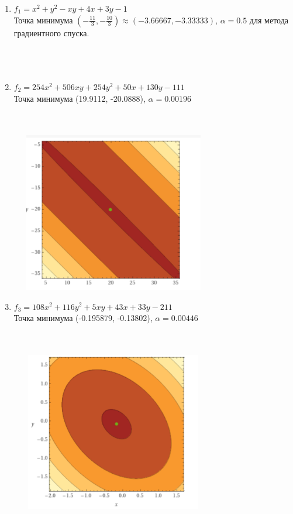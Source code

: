 \begin{enumerate}
	\item \(f_1 = x^2 + y^2 - xy + 4x + 3y - 1\) \\
	      Точка минимума \(\left( - \frac{11}{3}, - \frac{10}{3} \right) \approx ( - 3.66667, - 3.33333)\), $\alpha = 0.5$ для метода градиентного спуска. \\
	      \\
	       \\
	      \


	\item \(f_2 = 254x^2 + 506xy + 254y^2 + 50x + 130y - 111\) \\
	      Точка минимума (19.9112, -20.0888), $\alpha = 0.00196$ \\
	      \\
	       \\

	      \begin{center}
		      \includegraphics[width=9cm, height=7cm]{img/f2.png}
	      \end{center}

	\item \(f_3 = 108x^2 + 116y^2 + 5xy + 43x + 33y - 211\) \\
	      Точка минимума (-0.195879, -0.13802), $\alpha = 0.00446$  \\
	      \\
	       \\
	      \begin{center}
		      \includegraphics[width=9cm, height=7cm]{img/f3.png}
	      \end{center}

\end{enumerate}

